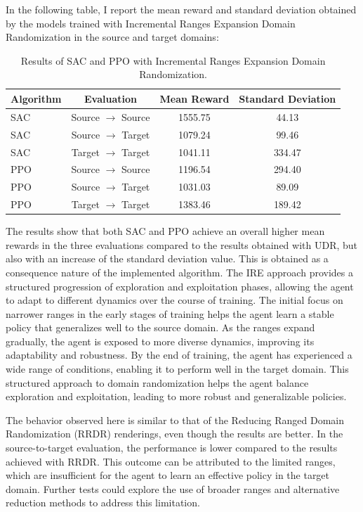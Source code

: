 \documentclass[11pt]{article}
\begin{document}
In the following table, I report the mean reward and standard deviation obtained by the models trained with Incremental Ranges Expansion Domain Randomization in the source and target domains:

\begin{table}[H]
    \centering
    \begin{tabular}{|l|c|c|c|}
        \hline
        \textbf{Algorithm} & \textbf{Evaluation} & \textbf{Mean Reward} & \textbf{Standard Deviation} \\ \hline
        SAC & Source $\rightarrow$ Source & 1555.75 & 44.13 \\ 
        SAC & Source $\rightarrow$ Target & 1079.24 & 99.46 \\ 
        SAC & Target $\rightarrow$ Target & 1041.11 & 334.47 \\ \hline
        PPO & Source $\rightarrow$ Source & 1196.54 & 294.40 \\ 
        PPO & Source $\rightarrow$ Target & 1031.03 & 89.09 \\ 
        PPO & Target $\rightarrow$ Target & 1383.46 & 189.42 \\ \hline
    \end{tabular}
    \caption{Results of SAC and PPO with Incremental Ranges Expansion Domain Randomization.}
    \label{tab:results_ire}
\end{table}

The results show that both SAC and PPO achieve an overall higher mean rewards in the three evaluations compared to the results obtained with UDR, but also with an increase of the standard deviation value. This is obtained as a consequence  nature of the implemented algorithm. The IRE approach provides a structured progression of exploration and exploitation phases, allowing the agent to adapt to different dynamics over the course of training. The initial focus on narrower ranges in the early stages of training helps the agent learn a stable policy that generalizes well to the source domain. As the ranges expand gradually, the agent is exposed to more diverse dynamics, improving its adaptability and robustness. By the end of training, the agent has experienced a wide range of conditions, enabling it to perform well in the target domain. This structured approach to domain randomization helps the agent balance exploration and exploitation, leading to more robust and generalizable policies.

The behavior observed here is similar to that of the Reducing Ranged Domain Randomization (RRDR) renderings, even though the results are better. In the source-to-target evaluation, the performance is lower compared to the results achieved with RRDR. This outcome can be attributed to the limited ranges, which are insufficient for the agent to learn an effective policy in the target domain. Further tests could explore the use of broader ranges and alternative reduction methods to address this limitation.
\end{document}
